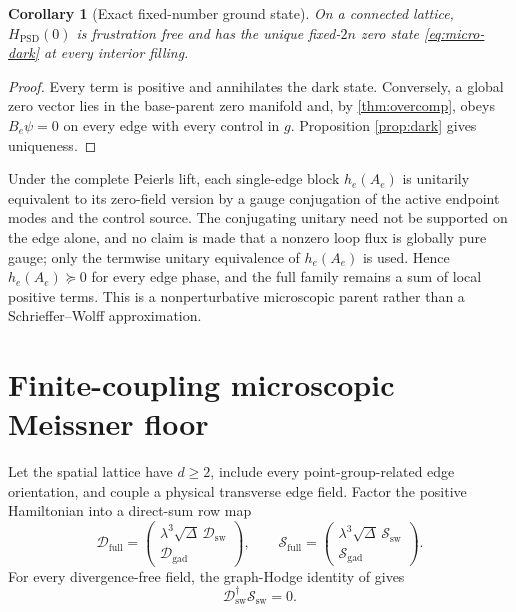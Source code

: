 \documentclass[11pt]{article}
\newtheorem{corollary}[theorem]{Corollary}
\theoremstyle{definition}
\theoremstyle{remark}
\newcommand{\cS}{\mathcal S}
\newcommand{\cD}{\mathcal D}
\begin{document}
\begin{corollary}[Exact fixed-number ground state]
\label{cor:PSD-ground}
On a connected lattice, $H_{\mathrm{PSD}}(0)$ is frustration free and has the unique fixed-$2n$ zero state \eqref{eq:micro-dark} at every interior filling.
\end{corollary}

\begin{proof}
Every term is positive and annihilates the dark state.  Conversely, a global zero vector lies in the base-parent zero manifold and, by \cref{thm:overcomp}, obeys $B_e\psi=0$ on every edge with every control in $g$.  Proposition \ref{prop:dark} gives uniqueness.
\end{proof}

Under the complete Peierls lift, each single-edge block $h_e(A_e)$ is
unitarily equivalent to its zero-field version by a gauge conjugation of the
active endpoint modes and the control source.  The conjugating unitary need not
be supported on the edge alone, and no claim is made that a nonzero loop flux is
globally pure gauge; only the termwise unitary equivalence of $h_e(A_e)$ is used.
Hence $h_e(A_e)\succeq0$ for every edge phase, and the full family remains a sum
of local positive terms.  This is a nonperturbative microscopic parent rather
than a Schrieffer--Wolff approximation.

\section{Finite-coupling microscopic Meissner floor}\label{sec:micro-floor}

Let the spatial lattice have $d\ge2$, include every point-group-related edge orientation, and couple a physical transverse edge field.  Factor the positive Hamiltonian into a direct-sum row map
\begin{equation}
 \cD_{\mathrm{full}}=
 \begin{pmatrix}
 \lambda^3\sqrt\Delta\,\cD_{\mathrm{sw}}\\
 \cD_{\mathrm{gad}}
 \end{pmatrix},
 \qquad
 \cS_{\mathrm{full}}=
 \begin{pmatrix}
 \lambda^3\sqrt\Delta\,\cS_{\mathrm{sw}}\\
 \cS_{\mathrm{gad}}
 \end{pmatrix}.
 \label{eq:row-stack}
\end{equation}
For every divergence-free field, the graph-Hodge identity of
\cite{SledgianowskiMeissner} gives
\begin{equation}
 \cD_{\mathrm{sw}}^\dagger\cS_{\mathrm{sw}}=0.
 \label{eq:sw-kernel}
\end{equation}
\end{document}
